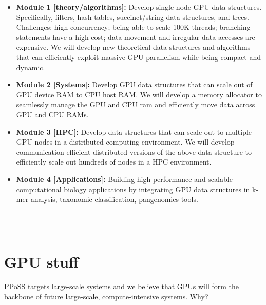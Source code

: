 \begin{itemize}[noitemsep, leftmargin=*]
  \item {\bf Module 1 [theory/algorithms]:} Develop single-node GPU data structures.
    Specifically, filters, hash tables, succinct/string data structures, and
    trees. Challenges: high concurrency; being able to scale 100K threads;
    branching statements have a high cost; data movement and irregular data
    accesses are expensive. We will develop new theoretical data structures and
    algorithms that can efficiently exploit massive GPU parallelism while being
    compact and dynamic.

  \item {\bf Module 2 [Systems]:} Develop GPU data structures that can scale out of
      GPU device RAM to CPU host RAM. We will develop a memory allocator to
      seamlessly manage the GPU and CPU ram and efficiently move data across GPU
      and CPU RAMs.

    \item {\bf Module 3 [HPC]:} Develop data structures that can scale out to
      multiple-GPU nodes in a distributed computing environment. We will develop
      communication-efficient distributed versions of the above data structure
      to efficiently scale out hundreds of nodes in a HPC environment.

    \item {\bf Module 4 [Applications]:} Building high-performance and scalable
      computational biology applications by integrating GPU data structures in
      k-mer analysis, taxonomic classification, pangenomics tools.

\end{itemize}

\\
\\


\section{GPU stuff}

PPoSS targets large-scale systems and we believe that GPUs will form the backbone of future large-scale, compute-intensive systems. Why?

